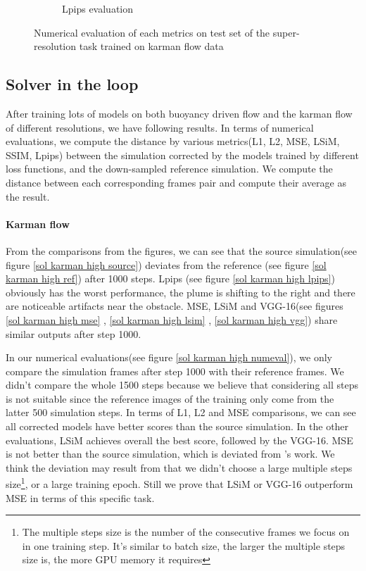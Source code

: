 \documentclass[a4paper,12pt,twoside]{report}
\begin{document}
\begin{figure}
\begin{subfigure}{0.32\textwidth}
		\caption{Lpips evaluation}
	\end{subfigure}
	\caption{Numerical evaluation of each metrics on test set of the super-resolution task trained on karman flow data}
	\label{super karman numeval}
\end{figure}

\subsection{Solver in the loop}
After training lots of models on both buoyancy driven flow and the karman flow of different resolutions, we have following results. In terms of numerical evaluations, we compute the distance by various metrics(L1, L2, MSE, LSiM, SSIM, Lpips) between the simulation corrected by the models trained by different loss functions, and the down-sampled reference simulation. We compute the distance between each corresponding frames pair and compute their average as the result.

\paragraph{Karman flow}
From the comparisons from the figures, we can see that the source simulation(see figure \ref{sol karman high source}) deviates from the reference (see figure \ref{sol karman high ref}) after 1000 steps. Lpips (see figure \ref{sol karman high lpips}) obviously has the worst performance, the plume is shifting to the right and there are noticeable artifacts near the obstacle. MSE, LSiM and VGG-16(see figures \ref{sol karman high mse} , \ref{sol karman high lsim} , \ref{sol karman high vgg})  share similar outputs after step 1000.

In our numerical evaluations(see figure \ref{sol karman high numeval}), we only compare the simulation frames after step 1000 with their reference frames. We didn't compare the whole 1500 steps because we believe that considering all steps is not suitable since the reference images of the training only come from the latter 500 simulation steps. In terms of L1, L2 and MSE comparisons, we can see all corrected models have better scores than the source simulation. In the other evaluations, LSiM achieves overall the best score, followed by the VGG-16. MSE is not better than the source simulation, which is deviated from \citeauthor{um2020sol}'s work. We think the deviation may result from that we didn't choose a large multiple steps size\footnote{The multiple steps size is the number of the consecutive frames we focus on in one training step. It's similar to batch size, the larger the multiple steps size is, the more GPU memory it requires}, or a large training epoch. Still we prove that LSiM or VGG-16 outperform MSE in terms of this specific task.
\end{document}
